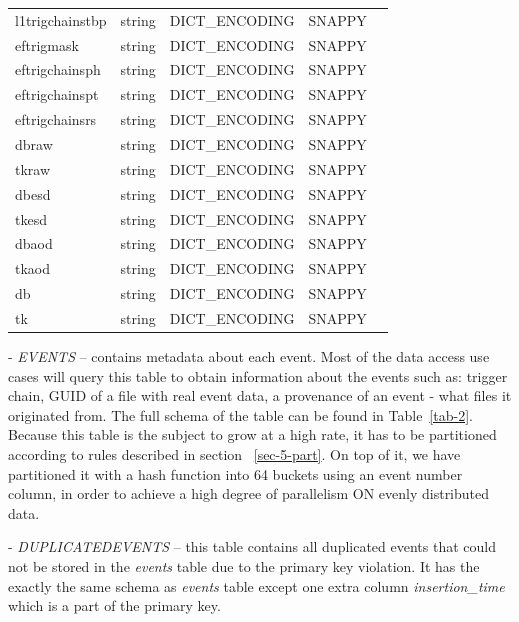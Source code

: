 \documentclass{webofc}
\begin{document}
\begin{linenumbers}
\begin{table}
\begin{tabular}{lllll}
l1trigchainstbp & string     & DICT\_ENCODING & SNAPPY &  \\
eftrigmask      & string     & DICT\_ENCODING & SNAPPY &  \\
eftrigchainsph  & string     & DICT\_ENCODING & SNAPPY &  \\
eftrigchainspt  & string     & DICT\_ENCODING & SNAPPY &  \\
eftrigchainsrs  & string     & DICT\_ENCODING & SNAPPY &  \\
dbraw           & string     & DICT\_ENCODING & SNAPPY &  \\
tkraw           & string     & DICT\_ENCODING & SNAPPY &  \\
dbesd           & string     & DICT\_ENCODING & SNAPPY &  \\
tkesd           & string     & DICT\_ENCODING & SNAPPY &  \\
dbaod           & string     & DICT\_ENCODING & SNAPPY &  \\
tkaod           & string     & DICT\_ENCODING & SNAPPY &  \\
db              & string     & DICT\_ENCODING & SNAPPY &  \\
tk              & string     & DICT\_ENCODING & SNAPPY &  \\
\hline
\end{tabular}
\end{table}


- \textit{EVENTS} – contains metadata about each event. Most of the data access use cases will query this table to obtain information about the events such as: trigger chain, GUID of a file with real event data, a provenance of an event - what files it originated from. The full schema of the table can be found in Table~\ref{tab-2}. Because this table is the subject to grow at a high rate, it has to be partitioned according to rules described in section ~\ref{sec-5-part}. On top of it, we have partitioned it with a hash function into 64 buckets using an event number column, in order to achieve a high degree of parallelism ON evenly distributed data. \newline

- \textit{DUPLICATEDEVENTS} – this table contains all duplicated events that could not be stored in the \textit{events} table due to the primary key violation. It has the exactly the same schema as \textit{events} table except one extra column \textit{insertion\_time} which is a part of the primary key.\newline


\end{linenumbers}
\end{document}
